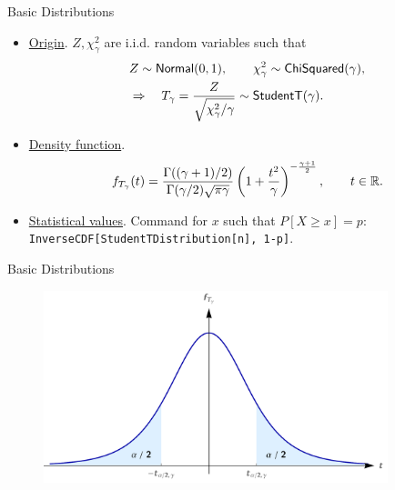 \begin{frame}{Basic Distributions}

\begin{itemize}
	\item \underline{Origin}. $Z, \chi_{\gamma}^2$ are i.i.d. random variables such that
	\begin{align*}
	& Z \sim \mathsf{Normal}(0, 1), \qquad \chi_{\gamma}^2\sim \mathsf{ChiSquared}(\gamma), \\
	& \Rightarrow \quad T_{\gamma} = \frac{Z}{\sqrt{\chi_{\gamma}^2/\gamma}} \sim \mathsf{StudentT}(\gamma).
	\end{align*}
	\item \underline{Density function}.
	\begin{align*}
	f_{T_{\gamma}}(t) = \frac{\Gamma((\gamma+1)/2)}{\Gamma(\gamma/2)\sqrt{\pi\gamma}}\left(1 + \frac{t^2}{\gamma} \right)^{-\frac{\gamma+1}{2}}, \qquad t\in \mathbb{R}.
	\end{align*}
	\item \underline{Statistical values}. Command for $x$ such that $P[X\geq x] = p$:\\
	\texttt{InverseCDF[StudentTDistribution[n], 1-p]}.
\end{itemize}

\end{frame}

\begin{frame}{Basic Distributions}

\begin{figure}[htbp]
	\centering
	\includegraphics[width=10cm]{./images/rc4fig5.png}
\end{figure}

\end{frame}

